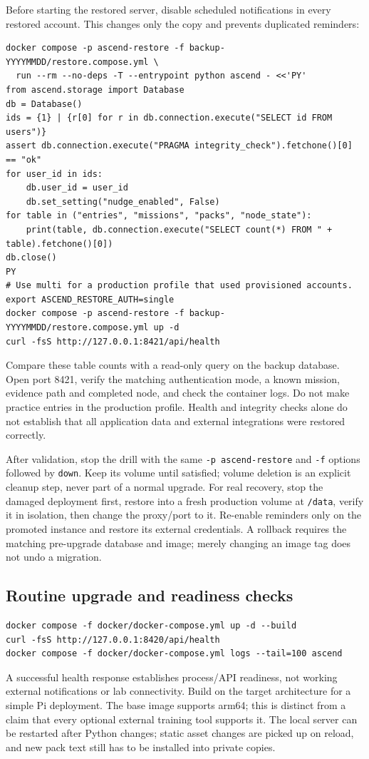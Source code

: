 Before starting the restored server, disable scheduled notifications in every
restored account. This changes only the copy and prevents duplicated reminders:
\begin{verbatim}
docker compose -p ascend-restore -f backup-YYYYMMDD/restore.compose.yml \
  run --rm --no-deps -T --entrypoint python ascend - <<'PY'
from ascend.storage import Database
db = Database()
ids = {1} | {r[0] for r in db.connection.execute("SELECT id FROM users")}
assert db.connection.execute("PRAGMA integrity_check").fetchone()[0] == "ok"
for user_id in ids:
    db.user_id = user_id
    db.set_setting("nudge_enabled", False)
for table in ("entries", "missions", "packs", "node_state"):
    print(table, db.connection.execute("SELECT count(*) FROM " + table).fetchone()[0])
db.close()
PY
# Use multi for a production profile that used provisioned accounts.
export ASCEND_RESTORE_AUTH=single
docker compose -p ascend-restore -f backup-YYYYMMDD/restore.compose.yml up -d
curl -fsS http://127.0.0.1:8421/api/health
\end{verbatim}
Compare these table counts with a read-only query on the backup database. Open
port 8421, verify the matching authentication mode, a known mission, evidence path
and completed node, and check the container logs. Do not make practice entries in
the production profile. Health and integrity checks alone do not establish that
all application data and external integrations were restored correctly.

After validation, stop the drill with the same \texttt{-p ascend-restore} and
\texttt{-f} options followed by \texttt{down}. Keep its volume until satisfied;
volume deletion is an explicit cleanup step, never part of a normal upgrade.
For real recovery, stop the damaged deployment first, restore into a fresh
production volume at \texttt{/data}, verify it in isolation, then change the
proxy/port to it. Re-enable reminders only on the promoted instance and restore
its external credentials. A rollback requires the matching pre-upgrade database
and image; merely changing an image tag does not undo a migration.

\subsection{Routine upgrade and readiness checks}

\begin{verbatim}
docker compose -f docker/docker-compose.yml up -d --build
curl -fsS http://127.0.0.1:8420/api/health
docker compose -f docker/docker-compose.yml logs --tail=100 ascend
\end{verbatim}
A successful health response establishes process/API readiness, not working
external notifications or lab connectivity. Build on the target architecture for
a simple Pi deployment. The base image supports arm64; this is distinct from a
claim that every optional external training tool supports it. The local server
can be restarted after Python changes; static asset changes are picked up on
reload, and new pack text still has to be installed into private copies.

